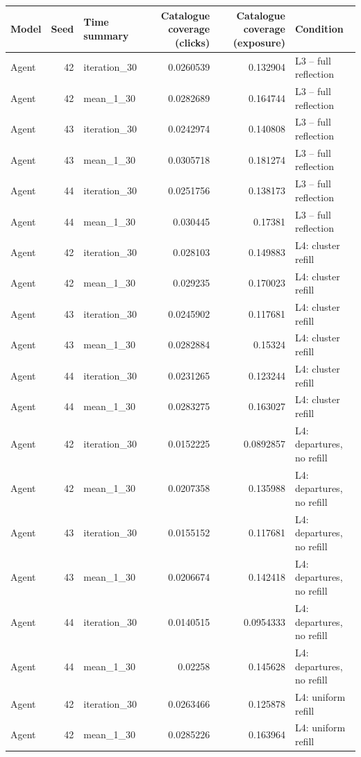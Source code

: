 \begin{table}[htbp!]
\centering
\small
\setlength{\tabcolsep}{3pt}
\renewcommand{\arraystretch}{1.1}
\begin{tabular}{lrlrrl}
\hline
Model & Seed & Time summary & Catalogue coverage (clicks) & Catalogue coverage (exposure) & Condition \\
\hline
Agent & 42 & iteration\_30 & 0.0260539 & 0.132904 & L3 -- full reflection \\
Agent & 42 & mean\_1\_30 & 0.0282689 & 0.164744 & L3 -- full reflection \\
Agent & 43 & iteration\_30 & 0.0242974 & 0.140808 & L3 -- full reflection \\
Agent & 43 & mean\_1\_30 & 0.0305718 & 0.181274 & L3 -- full reflection \\
Agent & 44 & iteration\_30 & 0.0251756 & 0.138173 & L3 -- full reflection \\
Agent & 44 & mean\_1\_30 & 0.030445 & 0.17381 & L3 -- full reflection \\
Agent & 42 & iteration\_30 & 0.028103 & 0.149883 & L4: cluster refill \\
Agent & 42 & mean\_1\_30 & 0.029235 & 0.170023 & L4: cluster refill \\
Agent & 43 & iteration\_30 & 0.0245902 & 0.117681 & L4: cluster refill \\
Agent & 43 & mean\_1\_30 & 0.0282884 & 0.15324 & L4: cluster refill \\
Agent & 44 & iteration\_30 & 0.0231265 & 0.123244 & L4: cluster refill \\
Agent & 44 & mean\_1\_30 & 0.0283275 & 0.163027 & L4: cluster refill \\
Agent & 42 & iteration\_30 & 0.0152225 & 0.0892857 & L4: departures, no refill \\
Agent & 42 & mean\_1\_30 & 0.0207358 & 0.135988 & L4: departures, no refill \\
Agent & 43 & iteration\_30 & 0.0155152 & 0.117681 & L4: departures, no refill \\
Agent & 43 & mean\_1\_30 & 0.0206674 & 0.142418 & L4: departures, no refill \\
Agent & 44 & iteration\_30 & 0.0140515 & 0.0954333 & L4: departures, no refill \\
Agent & 44 & mean\_1\_30 & 0.02258 & 0.145628 & L4: departures, no refill \\
Agent & 42 & iteration\_30 & 0.0263466 & 0.125878 & L4: uniform refill \\
Agent & 42 & mean\_1\_30 & 0.0285226 & 0.163964 & L4: uniform refill \\

\end{tabular}
\end{table}
